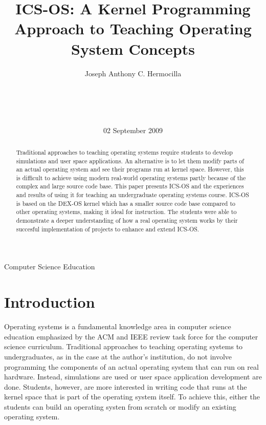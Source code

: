 \documentclass{acm_proc_article-sp}
\begin{document}
\title{ICS-OS: A Kernel Programming Approach to Teaching Operating System
Concepts}

\author{
\alignauthor
Joseph Anthony C. Hermocilla\\
       \\
       \\
       \\
       \\
}
\date{02 September 2009}

\maketitle
\begin{abstract}
Traditional approaches to teaching operating systems require students to
develop simulations and user space applications. An alternative
is to let them modify parts of an actual operating system and see their
programs run at kernel space. However, this is difficult to 
achieve using modern real-world operating systems partly because of the complex
and large source code base. This paper presents ICS-OS and the experiences and
results of using it for teaching an undergraduate operating systems course. 
ICS-OS is based on the DEX-OS kernel which has a smaller source code base
compared to other operating systems, making it ideal for instruction. 
The students were able to demonstrate a deeper understanding
of how a real operating system works by their succesful implementation of
projects to enhance and extend ICS-OS.
\end{abstract}

{Computer Science Education}


\section{Introduction}
Operating systems is a fundamental knowledge area in computer science education
emphasized by the ACM and IEEE review task force for the computer science 
curriculum. Traditional approaches to teaching operating systems to 
undergraduates, as in the case at the author's institution, do not involve 
programming the components of an actual operating system that can run on 
real hardware. Instead, simulations are used or user space application 
development are done. Students, however, are more interested in writing code
that runs at the kernel space that is part of the operating system itself.
To achieve this, either the students can build an operating systen from scratch
or modify an existing operating system. 
\end{document}
